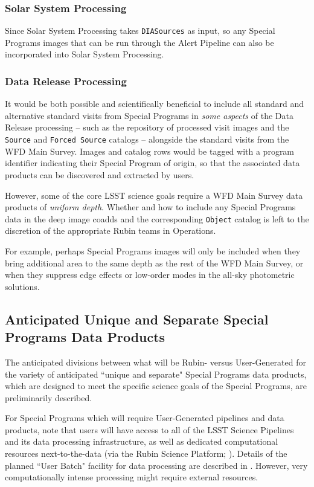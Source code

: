 \documentclass[DM,lsstdoc,toc]{lsstdoc}
\begin{document}
\subsubsection{Solar System Processing}

Since Solar System Processing takes \texttt{DIASources} as input, so any Special Programs images that can be run through the Alert Pipeline can also be incorporated into Solar System Processing.

\subsubsection{Data Release Processing}

It would be both possible and scientifically beneficial to include all standard and alternative standard visits from Special Programs in {\it some aspects} of the Data Release processing -- such as the repository of processed visit images and the {\tt Source} and {\tt Forced Source} catalogs -- alongside the standard visits from the WFD Main Survey.
Images and catalog rows would be tagged with a program identifier indicating their Special Program of origin, so that the associated data products can be discovered and extracted by users.

However, some of the core LSST science goals require a WFD Main Survey data products of {\it uniform depth}.
Whether and how to include any Special Programs data in the deep image coadds and the corresponding {\tt Object} catalog is left to the discretion of the appropriate Rubin teams in Operations.

For example, perhaps Special Programs images will only be included when they bring additional area to the same depth as the rest of the WFD Main Survey, or when they suppress edge effects or low-order modes in the all-sky photometric solutions.


\subsection{Anticipated Unique and Separate Special Programs Data Products}\label{ssec:proc_spdp}

The anticipated divisions between what will be Rubin- versus User-Generated for the variety of anticipated ``unique and separate" Special Programs data products, which are designed to meet the specific science goals of the Special Programs, are preliminarily described.

For Special Programs which will require User-Generated pipelines and data products, note that users will have access to all of the LSST Science Pipelines and its data processing infrastructure, as well as dedicated computational resources next-to-the-data (via the Rubin Science Platform; ).
Details of the planned ``User Batch" facility for data processing are described in .
However, very computationally intense processing might require external resources. 
\end{document}
